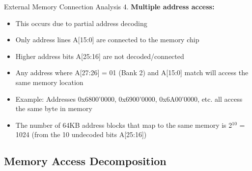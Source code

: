 \begin{example2}{External Memory Connection Analysis}
4. \textbf{Multiple address access:}
   \begin{itemize}
     \item This occurs due to partial address decoding
     \item Only address lines A[15:0] are connected to the memory chip
     \item Higher address bits A[25:16] are not decoded/connected
     \item Any address where A[27:26] = 01 (Bank 2) and A[15:0] match will access the same memory location
     \item Example: Addresses 0x6800'0000, 0x6900'0000, 0x6A00'0000, etc. all access the same byte in memory
     \item The number of 64KB address blocks that map to the same memory is 2$^{10}$ = 1024 (from the 10 undecoded bits A[25:16])
   \end{itemize}
\end{example2}

\subsection{Memory Access Decomposition}

